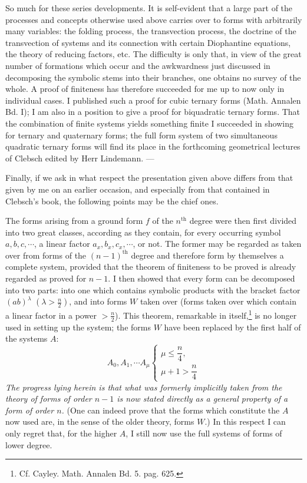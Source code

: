 \documentclass[10pt]{article}
\providecommand{\bdots}{\cdots}
\begin{document}
So much for these series developments. It is self-evident that a large part of the processes and concepts otherwise used above carries over to forms with arbitrarily many variables: the folding process, the transvection process, the doctrine of the transvection of systems and its connection with certain Diophantine equations, the theory of reducing factors, etc. The difficulty is only that, in view of the great number of formations which occur and the awkwardness just discussed in decomposing the symbolic stems into their branches, one obtains no survey of the whole. A proof of finiteness has therefore succeeded for me up to now only in individual cases. I published such a proof for cubic ternary forms (Math. Annalen Bd. I); I am also in a position to give a proof for biquadratic ternary forms. That the combination of finite systems yields something finite I succeeded in showing for ternary and quaternary forms; the full form system of two simultaneous quadratic ternary forms will find its place in the forthcoming geometrical lectures of Clebsch edited by Herr Lindemann. ---

Finally, if we ask in what respect the presentation given above differs from that given by me on an earlier occasion, and especially from that contained in Clebsch's book, the following points may be the chief ones.

The forms arising from a ground form $f$ of the $n^{\mathrm{th}}$ degree were then first divided into two great classes, according as they contain, for every occurring symbol $a,b,c,\cdots$, a linear factor $a_x,b_x,c_x,\cdots$, or not. The former may be regarded as taken over from forms of the $(n-1)^{\mathrm{th}}$ degree and therefore form by themselves a complete system, provided that the theorem of finiteness to be proved is already regarded as proved for $n-1$. I then showed that every form can be decomposed into two parts: into one which contains symbolic products with the bracket factor $(ab)^\lambda$ $(\lambda>\frac n2)$, and into forms $W$ taken over (forms taken over which contain a linear factor in a power $>\frac n2$). This theorem, remarkable in itself,\footnote{Cf. Cayley. Math. Annalen Bd. 5. pag. 625.} is no longer used in setting up the system; the forms $W$ have been replaced by the first half of the systems $A$:
\[
A_0,A_1,\bdots A_\mu
\left\{
\begin{array}{l}
\mu\leq\dfrac n4,\\
\mu+1>\dfrac n4
\end{array}
\right.
\]
\textit{The progress lying herein is that what was formerly implicitly taken from the theory of forms of order $n-1$ is now stated directly as a general property of a form of order $n$.} (One can indeed prove that the forms which constitute the $A$ now used are, in the sense of the older theory, forms $W$.) In this respect I can only regret that, for the higher $A$, I still now use the full systems of forms of lower degree.
\end{document}
